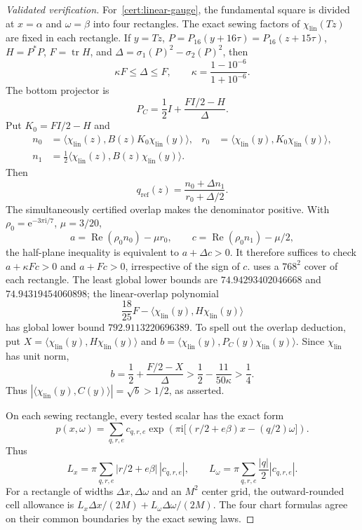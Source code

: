 \documentclass[11pt,reqno]{amsart}
\numberwithin{equation}{section}
\theoremstyle{definition}
\newcommand{\ip}[2]{\langle #1,#2\rangle}
\newcommand{\e}{\mathrm e}
\newcommand{\ii}{\mathrm i}
\begin{document}
\begin{proof}[Validated verification]
For~\ref{cert:linear-gauge}, the fundamental square is divided at
$x=\alpha$ and $\omega=\beta$ into four rectangles.  The exact sewing factors
of $\chi_{\mathrm{lin}}(Tz)$ are fixed in each rectangle.  If
$y=Tz$, $P=P_{16}(y+16\tau)=P_{16}(z+15\tau)$,
$H=P^*P$, $F=\operatorname{tr}H$, and
$\Delta=\sigma_1(P)^2-\sigma_2(P)^2$, then
\begin{equation}\label{eq:Delta-range}
 \kappa F\le\Delta\le F,\qquad
 \kappa=\frac{1-10^{-6}}{1+10^{-6}}.
\end{equation}
The bottom projector is
\[
 P_C=\frac12I+\frac{FI/2-H}{\Delta}.
\]
Put $K_0=FI/2-H$ and
\[
\begin{aligned}
 n_0&=\ip{\chi_{\mathrm{lin}}(z)}
 {B(z)K_0\chi_{\mathrm{lin}}(y)},&
 r_0&=\ip{\chi_{\mathrm{lin}}(y)}
 {K_0\chi_{\mathrm{lin}}(y)},\\
 n_1&=\frac12\ip{\chi_{\mathrm{lin}}(z)}
 {B(z)\chi_{\mathrm{lin}}(y)}.
\end{aligned}
\]
Then
\[
 q_{\mathrm{ref}}(z)=
 \frac{n_0+\Delta n_1}{r_0+\Delta/2}.
\]
The simultaneously certified overlap makes the denominator positive.  With
$\rho_0=\e^{-3\pi\ii/7}$, $\mu=3/20$,
\[
 a=\operatorname{Re}(\rho_0n_0)-\mu r_0,\qquad
 c=\operatorname{Re}(\rho_0n_1)-\mu/2,
\]
the half-plane inequality is equivalent to $a+\Delta c>0$.  It therefore
suffices to check $a+\kappa Fc>0$ and $a+Fc>0$, irrespective of the sign of
$c$.
 uses a $768^2$ cover of each
rectangle.  The least global lower bounds are
$74.94293402046668$ and $74.94319454060898$; the linear-overlap polynomial
\[
 \frac{18}{25}F-
 \ip{\chi_{\mathrm{lin}}(y)}{H\chi_{\mathrm{lin}}(y)}
\]
has global lower bound $792.9113220696389$.
To spell out the overlap deduction, put
$X=\ip{\chi_{\mathrm{lin}}(y)}{H\chi_{\mathrm{lin}}(y)}$ and
$b=\ip{\chi_{\mathrm{lin}}(y)}
{P_C(y)\chi_{\mathrm{lin}}(y)}$.  Since $\chi_{\mathrm{lin}}$ has unit norm,
\[
 b=\frac12+\frac{F/2-X}{\Delta}
 >\frac12-\frac{11}{50\kappa}>\frac14.
\]
Thus $|\ip{\chi_{\mathrm{lin}}(y)}{C(y)}|=\sqrt b>1/2$, as asserted.

On each sewing rectangle, every tested scalar has the exact form
\[
 p(x,\omega)=\sum_{q,r,e}c_{q,r,e}
 \exp\!\left(\pi\ii\bigl[(r/2+e\beta)x-(q/2)\omega\bigr]\right).
\]
Thus
\[
 L_x=\pi\sum_{q,r,e}|r/2+e\beta|\,|c_{q,r,e}|,\qquad
 L_\omega=\pi\sum_{q,r,e}\frac{|q|}{2}|c_{q,r,e}|.
\]
For a rectangle of widths $\Delta x,\Delta\omega$ and an $M^2$ center grid,
the outward-rounded cell allowance is
$L_x\Delta x/(2M)+L_\omega\Delta\omega/(2M)$.  The four chart formulas agree
on their common boundaries by the exact sewing laws.


\end{proof}
\end{document}

